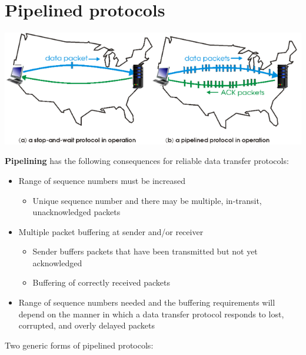 \documentclass{article}[18pt]
\begin{document}
\section{Pipelined protocols}
\begin{center}
	\includegraphics[scale=0.7]{pipelined_protocols1}
\end{center}
\textbf{Pipelining} has the following consequences for reliable data transfer protocols:
\begin{itemize}
	\item Range of sequence numbers must be increased
	\begin{itemize}
		\item Unique sequence number and there may be multiple, in-transit, unacknowledged packets
	\end{itemize}
	\item Multiple packet buffering at sender and/or receiver
	\begin{itemize}
		\item Sender buffers packets that have been transmitted but not yet acknowledged
		\item Buffering of correctly received packets
	\end{itemize}
	\item Range of sequence numbers needed and the buffering requirements will depend on the manner in which a data transfer protocol responds to lost, corrupted, and overly delayed packets
\end{itemize}
Two generic forms of pipelined protocols:
\end{document}
